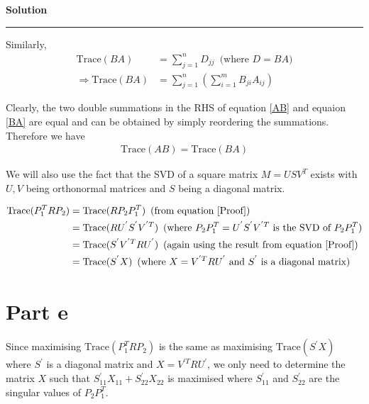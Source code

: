 \documentclass[a4paper,14pt]{article}
\newenvironment{solution}[2][]{%
    \begin{mdframed}[linecolor=blue!70!black, linewidth=2pt, roundcorner=10pt, backgroundcolor=yellow!10!white, skipabove=12pt, skipbelow=12pt]%
        \textbf{\large #2}
        \par\noindent\rule{\textwidth}{0.4pt}
}{
    \end{mdframed}
}
\begin{document}
\begin{solution}{Solution}
    Similarly, 
    \begin{align}
      \text{Trace}(BA) &= \sum\limits_{j = 1}^{n} D_{jj} \, \text{ (where $D = BA$)} \nonumber\\
      \Rightarrow \label{BA}  \text{Trace}(BA) &= \sum\limits_{j = 1}^{n} \left( \sum\limits_{i = 1}^{m} B_{ji} A_{ij}\right)
    \end{align}

    Clearly, the two double summations in the RHS of equation \@\ref{AB} and equaion \@\ref{BA} are equal
    and can be obtained by simply reordering the summations. Therefore we have 
    \begin{align}
      \label{Proof}\text{Trace}(AB) = \text{Trace}(BA)
    \end{align}

    We will also use the fact that the SVD of a square matrix $M = USV^{T}$ exists with $U,V$ being orthonormal matrices 
    and $S$ being a diagonal matrix.

    \begin{align*}
      \text{Trace}(P_{1}^{T}RP_{2}) &= \text{Trace}(RP_{2}P_{1}^{T}) \, \text{ (from equation \@\ref{Proof})} \\
                                    &= \text{Trace}(R U^{'} S^{'} V^{'T}) \, \text{ (where $P_{2}P_{1}^{T} = U^{'} S^{'} V^{'T}$ is the SVD of $P_{2}P_{1}^{T}$)} \\
                                    &= \text{Trace}(S^{'} V^{'T} R U^{'}) \, \text{ (again using the result from equation \@\ref{Proof})} \\
                                    &= \text{Trace}(S^{'} X) \, \text{ (where $X = V^{'T} R U^{'}$ and $S^{'}$ is a diagonal matrix)}
    \end{align*}

    \section{Part e}

    Since maximising $\text{Trace}(P_{1}^{T}RP_{2})$ is the same as maximising $\text{Trace}(S^{'}X)$ where $S^{'}$ is a 
    diagonal matrix and $X = V^{'T} R U^{'}$, we only need to determine the matrix $X$ such that 
    $S^{'}_{11}X_{11} + S^{'}_{22}X_{22}$ is maximised where $S^{'}_{11}$ and $S^{'}_{22}$ are the singular values of 
    $P_{2}P_{1}^{T}$. 


\end{solution}
\end{document}
